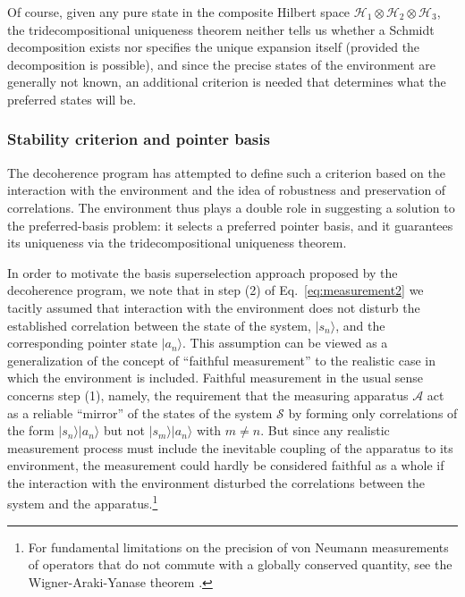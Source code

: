 \documentclass[twocolumn,rmp,aps,amsmath,amsfonts,noshowkeys,noshowpacs]{revtex4}
\newcommand{\ket}[1]{\ensuremath{|{#1\rangle}}}
\begin{document}
Of course, given any pure state in the composite Hilbert space
$\mathcal{H}_1 \otimes \mathcal{H}_2 \otimes \mathcal{H}_3$, the
tridecompositional uniqueness theorem neither tells us whether a
Schmidt decomposition exists nor specifies the unique expansion itself
(provided the decomposition is possible), and since the precise states
of the environment are generally not known, an additional criterion is
needed that determines what the preferred states will be.


\subsubsection{Stability criterion and pointer basis}

The decoherence program has attempted to define such a criterion based
on the interaction with the environment and the idea of robustness and
preservation of correlations. The environment thus plays a double role
in suggesting a solution to the preferred-basis problem: it selects a
preferred pointer basis, and it guarantees its uniqueness via the
tridecompositional uniqueness theorem.

In order to motivate the basis superselection approach proposed by the
decoherence program, we note that in step (2) of
Eq.~\eqref{eq:measurement2} we tacitly assumed that interaction with
the environment does not disturb the established correlation between
the state of the system, $\ket{s_n}$, and the corresponding pointer
state $\ket{a_n}$. This assumption can be viewed as a generalization
of the concept of ``faithful measurement'' to the realistic case in which
the environment is included.  Faithful measurement in the usual sense
concerns step (1), namely, the requirement that the measuring
apparatus $\mathcal{A}$ act as a reliable ``mirror'' of the states of
the system $\mathcal{S}$ by forming only correlations of the form
$\ket{s_n}\ket{a_n}$ but not $\ket{s_m} \ket{a_n}$ with $m \not= n$.
But since any realistic measurement process must include the
inevitable coupling of the apparatus to its environment, the
measurement could hardly be considered faithful as a whole if the
interaction with the environment disturbed the correlations between
the system and the apparatus.\footnote{For fundamental limitations on
  the precision of von Neumann measurements of operators that do not
  commute with a globally conserved quantity, see the
  Wigner-Araki-Yanase theorem \citep{Wigner:1952:gb,Araki:1960:ff}.}
\end{document}
